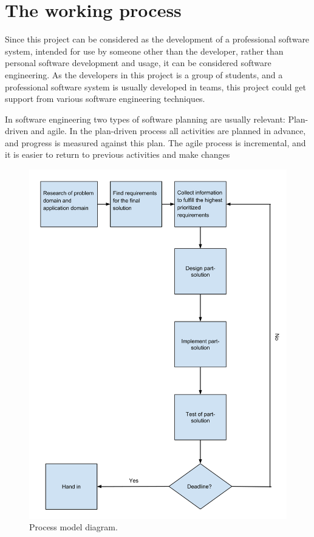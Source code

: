 \chapter{The working process}
Since this project can be considered as the development of a professional software system, intended for use by someone other than the developer, rather than personal software development and usage, it can be considered software engineering\cite{sommerville9ed}. As the developers in this project is a group of students, and a professional software system is usually developed in teams, this project could get support from various software engineering techniques.

In software engineering two types of software planning are usually relevant:  Plan-driven and agile\cite{sommerville9ed}. In the plan-driven process all activities are planned in advance, and progress is measured against this plan\cite{sommerville9ed}. The agile process is incremental, and it is easier to return to previous activities and make changes

\begin{figure}[h!]
\centering
\includegraphics[width=1.2\textwidth]{figures/ProcessmodelDiagram.png}
\caption{Process model diagram.}
\label{fig:processmodelDiagram}
\end{figure}

